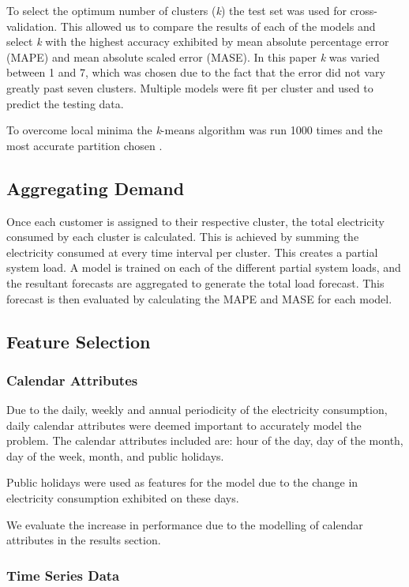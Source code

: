 To select the optimum number of clusters (\textit{k}) the test set was used for cross-validation. This allowed us to compare the results of each of the models and select \textit{k} with the highest accuracy exhibited by mean absolute percentage error (MAPE) and mean absolute scaled error (MASE). In this paper \textit{k} was varied between 1 and 7, which was chosen due to the fact that the error did not vary greatly past seven clusters. Multiple models were fit per cluster and used to predict the testing data.

To overcome local minima the \textit{k}-means algorithm was run 1000 times and the most accurate partition chosen \cite{Jain2010}.

\subsection{Aggregating Demand}

Once each customer is assigned to their respective cluster, the total electricity consumed by each cluster is calculated. This is achieved by summing the electricity consumed at every time interval per cluster. This creates a partial system load. A model is trained on each of the different partial system loads, and the resultant forecasts are aggregated to generate the total load forecast. This forecast is then evaluated by calculating the MAPE and MASE for each model. 

\subsection{Feature Selection}

\subsubsection{Calendar Attributes}

Due to the daily, weekly and annual periodicity of the electricity consumption, daily calendar attributes were deemed important to accurately model the problem. The calendar attributes included are: hour of the day, day of the month, day of the week, month, and public holidays.

Public holidays were used as features for the model due to the change in electricity consumption exhibited on these days.

We evaluate the increase in performance due to the modelling of calendar attributes in the results section.

\subsubsection{Time Series Data}

